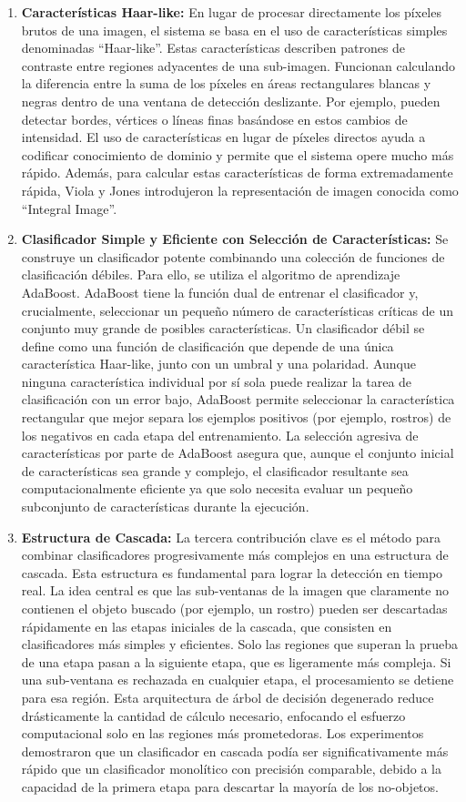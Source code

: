 \documentclass[a4paper]{article}
\begin{document}
\begin{enumerate}
    \item \textbf{Características Haar-like:} En lugar de procesar directamente los píxeles brutos de una imagen, el sistema se basa en el uso de características simples denominadas ``Haar-like''. Estas características describen patrones de contraste entre regiones adyacentes de una sub-imagen. Funcionan calculando la diferencia entre la suma de los píxeles en áreas rectangulares blancas y negras dentro de una ventana de detección deslizante. Por ejemplo, pueden detectar bordes, vértices o líneas finas basándose en estos cambios de intensidad. El uso de características en lugar de píxeles directos ayuda a codificar conocimiento de dominio y permite que el sistema opere mucho más rápido. Además, para calcular estas características de forma extremadamente rápida, Viola y Jones introdujeron la representación de imagen conocida como ``Integral Image''.
    \item \textbf{Clasificador Simple y Eficiente con Selección de Características:} Se construye un clasificador potente combinando una colección de funciones de clasificación débiles. Para ello, se utiliza el algoritmo de aprendizaje AdaBoost. AdaBoost tiene la función dual de entrenar el clasificador y, crucialmente, seleccionar un pequeño número de características críticas de un conjunto muy grande de posibles características. Un clasificador débil se define como una función de clasificación que depende de una única característica Haar-like, junto con un umbral y una polaridad. Aunque ninguna característica individual por sí sola puede realizar la tarea de clasificación con un error bajo, AdaBoost permite seleccionar la característica rectangular que mejor separa los ejemplos positivos (por ejemplo, rostros) de los negativos en cada etapa del entrenamiento. La selección agresiva de características por parte de AdaBoost asegura que, aunque el conjunto inicial de características sea grande y complejo, el clasificador resultante sea computacionalmente eficiente ya que solo necesita evaluar un pequeño subconjunto de características durante la ejecución.
    \item \textbf{Estructura de Cascada:} La tercera contribución clave es el método para combinar clasificadores progresivamente más complejos en una estructura de cascada. Esta estructura es fundamental para lograr la detección en tiempo real. La idea central es que las sub-ventanas de la imagen que claramente no contienen el objeto buscado (por ejemplo, un rostro) pueden ser descartadas rápidamente en las etapas iniciales de la cascada, que consisten en clasificadores más simples y eficientes. Solo las regiones que superan la prueba de una etapa pasan a la siguiente etapa, que es ligeramente más compleja. Si una sub-ventana es rechazada en cualquier etapa, el procesamiento se detiene para esa región. Esta arquitectura de árbol de decisión degenerado reduce drásticamente la cantidad de cálculo necesario, enfocando el esfuerzo computacional solo en las regiones más prometedoras. Los experimentos demostraron que un clasificador en cascada podía ser significativamente más rápido que un clasificador monolítico con precisión comparable, debido a la capacidad de la primera etapa para descartar la mayoría de los no-objetos.

\end{enumerate}
\end{document}
